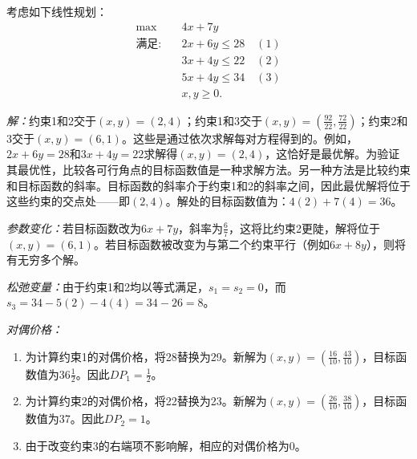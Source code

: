 \begin{translation}
考虑如下线性规划：
\[
\begin{aligned}
\max \quad & 4x + 7y \\
\text{满足:} \quad & 2x + 6y \le 28 \quad (1) \\
& 3x + 4y \le 22 \quad (2) \\
& 5x + 4y \le 34 \quad (3) \\
& x, y \ge 0.
\end{aligned}
\]

\noindent\textit{解：}约束1和2交于$(x, y) = (2,4)$；约束1和3交于$(x, y) = \left(\frac{92}{22}, \frac{72}{22}\right)$；约束2和3交于$(x, y) = (6,1)$。这些是通过依次求解每对方程得到的。例如，$2x + 6y = 28$和$3x + 4y = 22$求解得$(x, y) = (2,4)$，这恰好是最优解。为验证其最优性，比较各可行角点的目标函数值是一种求解方法。另一种方法是比较约束和目标函数的斜率。目标函数的斜率介于约束1和2的斜率之间，因此最优解将位于这些约束的交点处——即$(2,4)$。解处的目标函数值为：$4(2) + 7(4) = 36$。

\noindent\textit{参数变化：}若目标函数改为$6x + 7y$，斜率为$\frac{6}{7}$，这将比约束2更陡，解将位于$(x, y) = (6,1)$。若目标函数被改变为与第二个约束平行（例如$6x + 8y$），则将有无穷多个解。

\noindent\textit{松弛变量：}由于约束1和2均以等式满足，$s_1 = s_2 = 0$，而$s_3 = 34 - 5(2) - 4(4) = 34 - 26 = 8$。

\noindent\textit{对偶价格：}
\begin{enumerate}
\item 为计算约束1的对偶价格，将28替换为29。新解为$(x, y) = \left(\frac{16}{10}, \frac{43}{10}\right)$，目标函数值为$36\frac{1}{2}$。因此$DP_1 = \frac{1}{2}$。
\item 为计算约束2的对偶价格，将22替换为23。新解为$(x, y) = \left(\frac{26}{10}, \frac{38}{10}\right)$，目标函数值为37。因此$DP_2 = 1$。
\item 由于改变约束3的右端项不影响解，相应的对偶价格为0。
\end{enumerate}
\end{translation}

